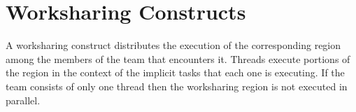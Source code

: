 %
%
%
%
%
%
%
%
%
%
%
%
%


\section{Worksharing Constructs}
\label{sec:Worksharing Constructs}
A worksharing construct distributes the execution of the corresponding region among 
the members of the team that encounters it. Threads execute portions of the region 
in the context of the implicit tasks that each one is executing. If the team consists 
of only one thread then the worksharing region is not executed in parallel.

